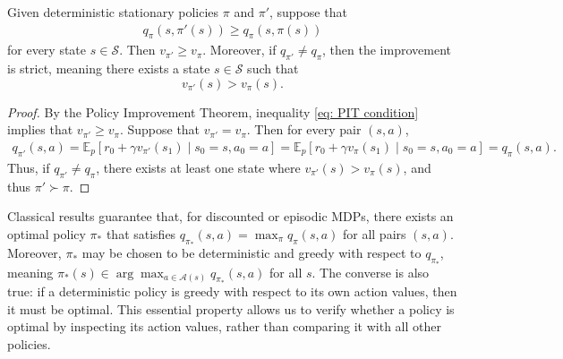 \begin{lemma}
\label{thm: strict PIT}
Given deterministic stationary policies $\pi$ and $\pi'$, suppose that
\begin{align}
\label{eq: PIT condition}
q_\pi(s,\pi'(s)) \ge q_\pi(s,\pi(s))
\end{align}
for every state $s\in\mathcal S$.
Then \(v_{\pi'} \ge v_\pi\). Moreover, if \(q_{\pi'}\neq q_\pi\), then the improvement is strict, meaning
there exists a state \(s\in\mathcal S\) such that
\[
v_{\pi'}(s)>v_\pi(s).
\]
\end{lemma}
\begin{proof}
By the Policy Improvement Theorem, inequality \eqref{eq: PIT condition} implies that $v_{\pi'} \ge v_\pi$.
Suppose that $v_{\pi'} = v_{\pi}$. Then for every pair $(s,a)$,
\begin{align*}
q_{\pi'}(s,a)
= \mathbb E_p\!\left[r_0+\gamma v_{\pi'}(s_1)\mid s_0=s,a_0=a\right]
= \mathbb E_p\!\left[r_0+\gamma v_{\pi}(s_1)\mid s_0=s,a_0=a\right]
= q_{\pi}(s,a) .
\end{align*}
Thus, if $q_{\pi'} \neq q_\pi$, there exists at least one state where $v_{\pi'}(s) > v_{\pi}(s)$, and thus $\pi' \succ \pi$.
\end{proof}

Classical results guarantee that, for discounted or episodic MDPs, 
there exists an optimal policy $\pi_*$ that satisfies $q_{\pi_*}(s,a) = \max_\pi q_\pi(s,a)$ for all pairs $(s,a)$.
Moreover, $\pi_*$ may be chosen to be deterministic and greedy with respect to $q_{\pi_*}$, meaning
$\pi_*(s) \in \arg\max_{a \in \mathcal A(s)} q_{\pi_*}(s,a)$ for all $s$.
The converse is also true: if a deterministic policy is greedy with respect to its own action values, then it must be optimal.
This essential property allows us to verify whether a policy is optimal by inspecting its action values, rather than comparing it with all other policies.





